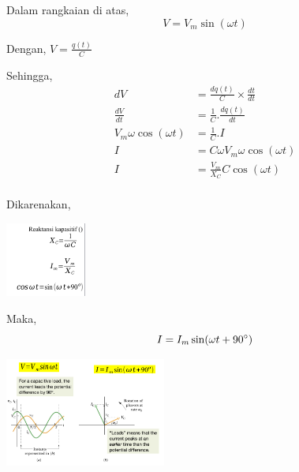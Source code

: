 \documentclass[twocolumn, 11pt]{article}%
\begin{document}
Dalam rangkaian di atas,
\[ V=V_m \sin (\omega t)\]

Dengan, $\displaystyle V=\frac{q(t)}{C}$

Sehingga,
\begin{align*}
    dV&=\frac{dq(t)}{C}\times\frac{dt}{dt}\\
    \frac{dV}{dt}&=\frac{1}{C}.\frac{dq(t)}{dt}\\
    V_m \omega\cos(\omega t)&=\frac{1}{C}.I\\
    I&= C \omega V_m \omega\cos(\omega t)\\
    I&= \frac{V_m}{X_C}C \cos(\omega t)\\
\end{align*}

Dikarenakan,
\begin{center}
    \includegraphics[width=100px]{9.png}
\end{center}

Maka,
\[ I=I_m \sin(\omega t+90\degree) \]

\begin{center}
    \includegraphics[width=200px]{10.png}
\end{center}
\end{document}

